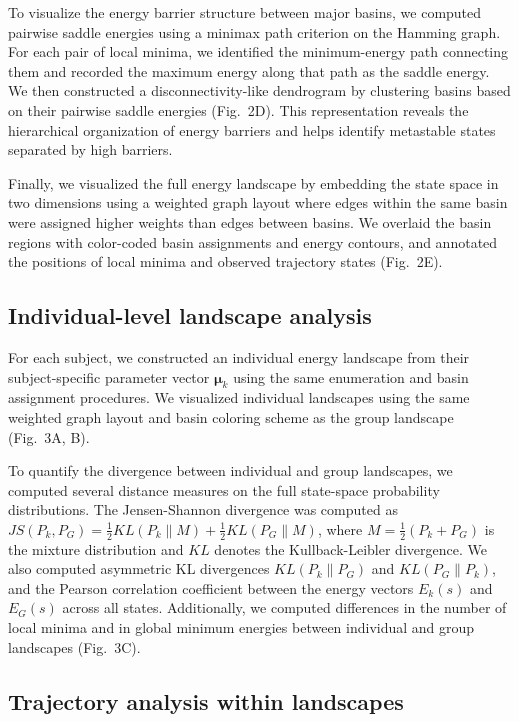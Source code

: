 To visualize the energy barrier structure between major basins, we computed pairwise saddle energies using a minimax path criterion on the Hamming graph. For each pair of local minima, we identified the minimum-energy path connecting them and recorded the maximum energy along that path as the saddle energy. We then constructed a disconnectivity-like dendrogram by clustering basins based on their pairwise saddle energies (Fig.~2D). This representation reveals the hierarchical organization of energy barriers and helps identify metastable states separated by high barriers.

Finally, we visualized the full energy landscape by embedding the state space in two dimensions using a weighted graph layout where edges within the same basin were assigned higher weights than edges between basins. We overlaid the basin regions with color-coded basin assignments and energy contours, and annotated the positions of local minima and observed trajectory states (Fig.~2E).

\subsection{Individual-level landscape analysis}

For each subject, we constructed an individual energy landscape from their subject-specific parameter vector $\boldsymbol{\mu}_k$ using the same enumeration and basin assignment procedures. We visualized individual landscapes using the same weighted graph layout and basin coloring scheme as the group landscape (Fig.~3A, B).

To quantify the divergence between individual and group landscapes, we computed several distance measures on the full state-space probability distributions. The Jensen-Shannon divergence was computed as $JS(P_k, P_G) = \frac{1}{2} KL(P_k \| M) + \frac{1}{2} KL(P_G \| M)$, where $M = \frac{1}{2}(P_k + P_G)$ is the mixture distribution and $KL$ denotes the Kullback-Leibler divergence. We also computed asymmetric KL divergences $KL(P_k \| P_G)$ and $KL(P_G \| P_k)$, and the Pearson correlation coefficient between the energy vectors $E_k(s)$ and $E_G(s)$ across all states. Additionally, we computed differences in the number of local minima and in global minimum energies between individual and group landscapes (Fig.~3C).

\subsection{Trajectory analysis within landscapes}

